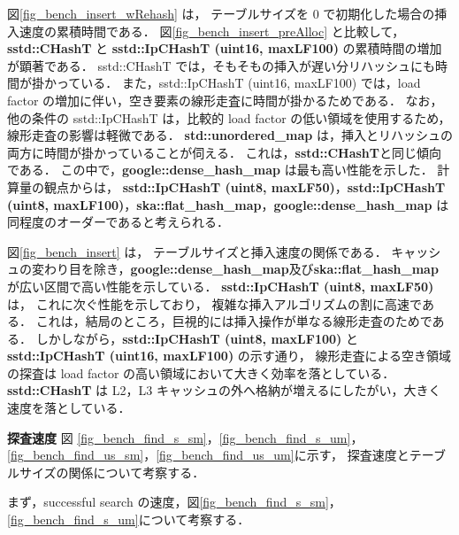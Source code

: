 図\ref{fig_bench_insert_wRehash} は，
テーブルサイズを 0 で初期化した場合の挿入速度の累積時間である．
図\ref{fig_bench_insert_preAlloc} と比較して，
{\bf sstd::CHashT} と {\bf sstd::IpCHashT (uint16, maxLF100)} の累積時間の増加が顕著である．
sstd::CHashT では，そもそもの挿入が遅い分リハッシュにも時間が掛かっている．
また，sstd::IpCHashT (uint16, maxLF100) では，load factor の増加に伴い，空き要素の線形走査に時間が掛かるためである．
なお，他の条件の sstd::IpCHashT は，比較的 load factor の低い領域を使用するため，線形走査の影響は軽微である．
{\bf std::unordered\_map} は，挿入とリハッシュの両方に時間が掛かっていることが伺える．
これは，{\bf sstd::CHashT}と同じ傾向である．
この中で，{\bf google::dense\_hash\_map} は最も高い性能を示した．
計算量の観点からは，
{\bf sstd::IpCHashT (uint8, maxLF50)}，{\bf sstd::IpCHashT (uint8, maxLF100)}，{\bf ska::flat\_hash\_map}，{\bf google::dense\_hash\_map} は
同程度のオーダーであると考えられる．

図\ref{fig_bench_insert} は，
テーブルサイズと挿入速度の関係である．
キャッシュの変わり目を除き，{\bf google::dense\_hash\_map}及び{\bf ska::flat\_hash\_map} が広い区間で高い性能を示している．
{\bf sstd::IpCHashT (uint8, maxLF50)} は，
これに次ぐ性能を示しており，
複雑な挿入アルゴリズムの割に高速である．
これは，結局のところ，巨視的には挿入操作が単なる線形走査のためである．
しかしながら，{\bf sstd::IpCHashT (uint8, maxLF100)} と {\bf sstd::IpCHashT (uint16, maxLF100)} の示す通り，
線形走査による空き領域の探査は load factor の高い領域において大きく効率を落としている．
{\bf sstd::CHashT} は L2，L3 キャッシュの外へ格納が増えるにしたがい，大きく速度を落としている．
\leavevmode \newline

%
{\bf 探査速度}
\samepage\newline\indent
図
\ref{fig_bench_find_s_sm}，\ref{fig_bench_find_s_um}，
\ref{fig_bench_find_us_sm}，\ref{fig_bench_find_us_um}に示す，
探査速度とテーブルサイズの関係について考察する．

まず，successful search の速度，図\ref{fig_bench_find_s_sm}，\ref{fig_bench_find_s_um}について考察する．

